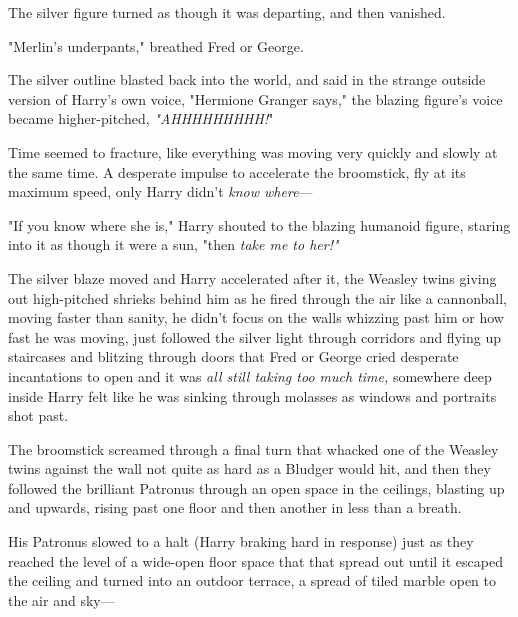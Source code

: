 The silver figure turned as though it was departing, and then vanished.

"Merlin's underpants," breathed Fred or George.

The silver outline blasted back into the world, and said in the strange outside version of Harry's own voice, "Hermione Granger says," the blazing figure's voice became higher-pitched, \emph{"AHHHHHHHHH!}"

Time seemed to fracture, like everything was moving very quickly and slowly at the same time. A desperate impulse to accelerate the broomstick, fly at its maximum speed, only Harry didn't \emph{know where}---

"If you know where she is," Harry shouted to the blazing humanoid figure, staring into it as though it were a sun, "then \emph{take me to her!"}

The silver blaze moved and Harry accelerated after it, the Weasley twins giving out high-pitched shrieks behind him as he fired through the air like a cannonball, moving faster than sanity, he didn't focus on the walls whizzing past him or how fast he was moving, just followed the silver light through corridors and flying up staircases and blitzing through doors that Fred or George cried desperate incantations to open and it was \emph{all still taking too much time,} somewhere deep inside Harry felt like he was sinking through molasses as windows and portraits shot past.

The broomstick screamed through a final turn that whacked one of the Weasley twins against the wall not quite as hard as a Bludger would hit, and then they followed the brilliant Patronus through an open space in the ceilings, blasting up and upwards, rising past one floor and then another in less than a breath.

His Patronus slowed to a halt (Harry braking hard in response) just as they reached the level of a wide-open floor space that that spread out until it escaped the ceiling and turned into an outdoor terrace, a spread of tiled marble open to the air and sky---